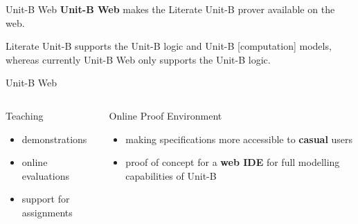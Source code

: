 \documentclass[10pt]{beamer}
\newcommand{\unitb}{Unit-B\xspace}
\begin{document}
\begin{frame}[fragile]{\unitb Web}
  \textbf{\unitb Web} makes the Literate \unitb prover available on
  the web.\newline \pause

  Literate Unit-B supports the Unit-B logic and Unit-B [computation]
  models, whereas currently Unit-B Web only supports the Unit-B logic.
\end{frame}

\begin{frame}[fragile]{\unitb Web}
  \begin{columns}[T,onlytextwidth]
      \begin{block}{Teaching}
        \begin{itemize}
        \item demonstrations
        \item online evaluations
        \item support for assignments
        \end{itemize}
      \end{block}
      \pause

      \begin{block}{Online Proof Environment}
        \begin{itemize}
        \item making specifications more accessible to \textbf{casual}
          users
        \item proof of concept for a \textbf{web IDE} for full
          modelling capabilities of \unitb
        \end{itemize}
      \end{block}
  \end{columns}
\end{frame}
\end{document}
